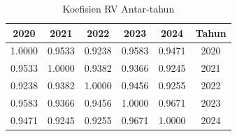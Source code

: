 \begin{table}[H]
\centering
\caption{Koefisien RV Antar-tahun} \label{tab:rv}
\begin{tabular}{|c|c|c|c|c|c|}
\hline
\textbf{2020} & \textbf{2021} & \textbf{2022} & \textbf{2023} & \textbf{2024} & \textbf{Tahun} \\
\hline
1.0000 & 0.9533 & 0.9238 & 0.9583 & 0.9471 & 2020 \\
0.9533 & 1.0000 & 0.9382 & 0.9366 & 0.9245 & 2021 \\
0.9238 & 0.9382 & 1.0000 & 0.9456 & 0.9255 & 2022 \\
0.9583 & 0.9366 & 0.9456 & 1.0000 & 0.9671 & 2023 \\
0.9471 & 0.9245 & 0.9255 & 0.9671 & 1.0000 & 2024 \\
\hline
\end{tabular}
\end{table}